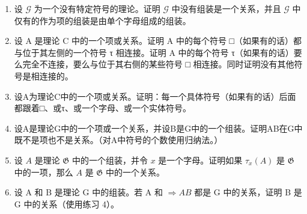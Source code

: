 \exercisegroup

\begin{enumerate}
\def\labelenumi{\arabic{enumi}.}
\item
  设 \(\mathcal{G}\) 为一个没有特定符号的理论。证明 \(\mathcal{G}\) 中没有组装是一个关系，并且 \(\mathcal{G}\) 中仅有的作为项的组装是由单个字母组成的组装。
\item
  设 A 是理论 C 中的一个项或关系。证明 A 中的每个符号 □（如果有的话）都与位于其左侧的一个符号 τ 相连接。证明 A 中的每个符号 τ（如果有的话）要么完全不连接，要么与位于其右侧的某些符号 □ 相连接。同时证明没有其他符号是相连接的。
\item
  设A为理论C中的一个项或关系。证明：每一个具体符号（如果有的话）后面都跟着□、或τ、或一个字母、或一个实体符号。
\item
  设A是理论G中的一个项或一个关系，并设B是G中的一个组装。证明AB在G中既不是项也不是关系。（对A中符号的个数使用归纳法。）
\item
  设 \(A\) 是理论 \(\mathfrak{G}\) 中的一个组装，并令 \(x\) 是一个字母。证明如果 \(\tau_{x}(A)\) 是 \(\mathfrak{G}\) 中的一项，那么 \(A\) 是 \(\mathfrak{G}\) 中的一个关系。
\item
  设 A 和 B 是理论 G 中的组装。若 A 和 \(\Longrightarrow AB\) 都是 G 中的关系，证明 B 是 G 中的关系（使用练习 4）。
\end{enumerate}

